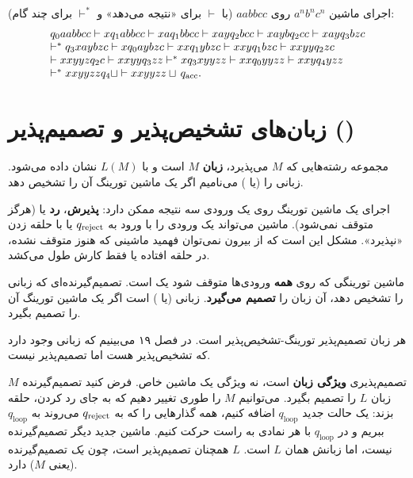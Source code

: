 \begin{example}
اجرای ماشین $a^nb^nc^n$ روی $aabbcc$ (با $\vdash$ برای «نتیجه می‌دهد» و $\vdash^*$ برای چند گام):
\[
\begin{array}{l}
q_0aabbcc\vdash xq_1abbcc\vdash xaq_1bbcc\vdash xayq_2bcc\vdash xaybq_2cc\vdash xayq_3bzc\\
\vdash^* q_3xaybzc\vdash xq_0aybzc\vdash xxq_1ybzc\vdash xxyq_1bzc\vdash xxyyq_2zc\\
\vdash xxyyzq_2c\vdash xxyyq_3zz\vdash^* xq_3xyyzz\vdash xxq_0yyzz\vdash xxyq_4yzz\\
\vdash^* xxyyzzq_4\sqcup\vdash xxyyzz\sqcup\, q_{\mathrm{acc}}.
\end{array}
\]
\end{example}

\section{زبان‌های تشخیص‌پذیر و تصمیم‌پذیر ()}

\begin{definition}
مجموعه رشته‌هایی که $M$ می‌پذیرد، \textbf{زبان} $M$ است و با $L(M)$ نشان داده می‌شود. زبانی را  (یا ) می‌نامیم اگر یک ماشین تورینگ آن را تشخیص دهد.
\end{definition}

اجرای یک ماشین تورینگ روی یک ورودی سه نتیجه ممکن دارد: \textbf{پذیرش}، \textbf{رد} یا  (هرگز متوقف نمی‌شود). ماشین می‌تواند یک ورودی را با ورود به $q_{\mathrm{reject}}$ یا با حلقه زدن «نپذیرد». مشکل این است که از بیرون نمی‌توان فهمید ماشینی که هنوز متوقف نشده، در حلقه افتاده یا فقط کارش طول می‌کشد.

\begin{definition}
ماشین تورینگی که روی \textbf{همه} ورودی‌ها متوقف شود یک  است. تصمیم‌گیرنده‌ای که زبانی را تشخیص دهد، آن زبان را \textbf{تصمیم می‌گیرد}. زبانی  (یا ) است اگر یک ماشین تورینگ آن را تصمیم بگیرد.
\end{definition}

هر زبان تصمیم‌پذیر تورینگ-تشخیص‌پذیر است. در فصل ۱۹ می‌بینیم که زبانی وجود دارد که تشخیص‌پذیر هست اما تصمیم‌پذیر نیست.

\begin{note}
تصمیم‌پذیری \textbf{ویژگی زبان} است، نه ویژگی یک ماشین خاص. فرض کنید تصمیم‌گیرنده $M$ زبان $L$ را تصمیم بگیرد. می‌توانیم $M$ را طوری تغییر دهیم که به جای رد کردن، حلقه بزند: یک حالت جدید $q_{\mathrm{loop}}$ اضافه کنیم، همه گذارهایی را که به $q_{\mathrm{reject}}$ می‌روند به $q_{\mathrm{loop}}$ ببریم و در $q_{\mathrm{loop}}$ با هر نمادی به راست حرکت کنیم. ماشین جدید دیگر تصمیم‌گیرنده نیست، اما زبانش همان $L$ است. $L$ همچنان تصمیم‌پذیر است، چون \emph{یک} تصمیم‌گیرنده (یعنی $M$) دارد.
\end{note}

